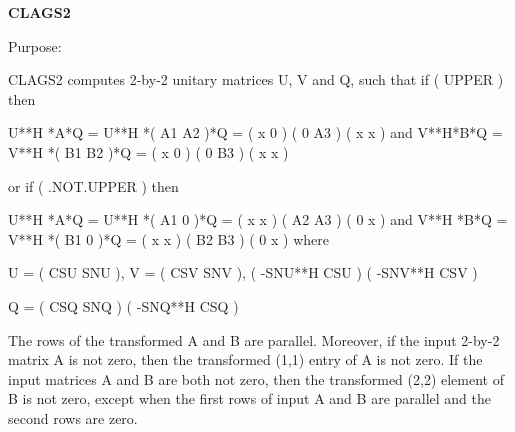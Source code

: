 {\bfseries C\+L\+A\+G\+S2} 

 \begin{DoxyParagraph}{Purpose\+: }
\begin{DoxyVerb} CLAGS2 computes 2-by-2 unitary matrices U, V and Q, such
 that if ( UPPER ) then

           U**H *A*Q = U**H *( A1 A2 )*Q = ( x  0  )
                             ( 0  A3 )     ( x  x  )
 and
           V**H*B*Q = V**H *( B1 B2 )*Q = ( x  0  )
                            ( 0  B3 )     ( x  x  )

 or if ( .NOT.UPPER ) then

           U**H *A*Q = U**H *( A1 0  )*Q = ( x  x  )
                             ( A2 A3 )     ( 0  x  )
 and
           V**H *B*Q = V**H *( B1 0  )*Q = ( x  x  )
                             ( B2 B3 )     ( 0  x  )
 where

   U = (   CSU    SNU ), V = (  CSV    SNV ),
       ( -SNU**H  CSU )      ( -SNV**H CSV )

   Q = (   CSQ    SNQ )
       ( -SNQ**H  CSQ )

 The rows of the transformed A and B are parallel. Moreover, if the
 input 2-by-2 matrix A is not zero, then the transformed (1,1) entry
 of A is not zero. If the input matrices A and B are both not zero,
 then the transformed (2,2) element of B is not zero, except when the
 first rows of input A and B are parallel and the second rows are
 zero.\end{DoxyVerb}
 
\end{DoxyParagraph}

